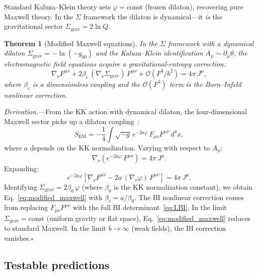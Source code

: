 \documentclass[prl,twocolumn,superscriptaddress,longbibliography]{revtex4-2}
\newtheorem{theorem}{Theorem}
\newcommand{\Sgrav}{\Sigma_{\mathrm{grav}}}
\begin{document}
Standard Kaluza--Klein theory sets $\varphi = \text{const}$
(frozen dilaton), recovering pure Maxwell theory.
In the $\Sigma$ framework the dilaton is dynamical---it
\emph{is} the gravitational sector $\Sgrav = 2\ln Q$.

\begin{theorem}[Modified Maxwell equations]
\label{thm:maxwell}
In the $\Sigma$ framework with a dynamical dilaton
$\Sgrav = -\ln(-g_{00})$ and the Kaluza--Klein identification
$A_\mu \sim \partial_\mu\theta$, the electromagnetic field
equations acquire a gravitational-entropy correction:
\begin{equation}
  \nabla_\nu F^{\mu\nu}
  + 2\beta_c\,(\nabla_\nu \Sgrav)\,F^{\mu\nu}
  + \mathcal{O}(F^3/b^2) = 4\pi\, J^\mu,
  \label{eq:modified_maxwell}
\end{equation}
where $\beta_c$ is a dimensionless coupling and the
$\mathcal{O}(F^3)$ term is the Born--Infeld nonlinear
correction.
\end{theorem}

\textit{Derivation.}---From the KK action with dynamical
dilaton, the four-dimensional Maxwell sector picks up a dilaton
coupling~\cite{MaedaOhta2004}:
\begin{equation}
  S_{\mathrm{EM}} = -\frac{1}{4}\!\int\!\sqrt{-g}\,
  e^{-2a\varphi}\,F_{\mu\nu}F^{\mu\nu}\,d^4x,
  \label{eq:dilaton_maxwell}
\end{equation}
where $a$ depends on the KK normalization.
Varying with respect to $A_\mu$:
\begin{equation}
  \nabla_\nu\!\left(e^{-2a\varphi}\,F^{\mu\nu}\right)
  = 4\pi\, J^\mu.
  \label{eq:em_eom}
\end{equation}
Expanding:
\begin{equation}
  e^{-2a\varphi}\!\left[\nabla_\nu F^{\mu\nu}
  - 2a\,(\nabla_\nu\varphi)\,F^{\mu\nu}\right]
  = 4\pi\, J^\mu.
\end{equation}
Identifying $\Sgrav = 2\beta_0\,\varphi$ (where $\beta_0$
is the KK normalization constant), we obtain
Eq.~\eqref{eq:modified_maxwell} with
$\beta_c = a/\beta_0$.
The BI nonlinear correction comes from replacing
$F_{\mu\nu}F^{\mu\nu}$ with the full BI
determinant~\eqref{eq:LBI}.
In the limit $\Sgrav = \text{const}$ (uniform gravity or flat
space), Eq.~\eqref{eq:modified_maxwell} reduces to standard
Maxwell.
In the limit $b \to \infty$ (weak fields), the BI correction
vanishes.\hfill$\square$

\subsection{Testable predictions}
\end{document}
